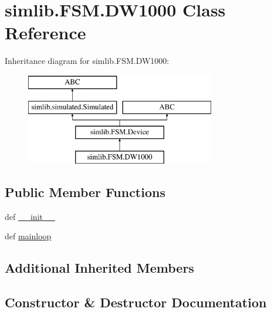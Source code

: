 \hypertarget{classsimlib_1_1_f_s_m_1_1_d_w1000}{}\section{simlib.\+F\+S\+M.\+D\+W1000 Class Reference}
\label{classsimlib_1_1_f_s_m_1_1_d_w1000}
Inheritance diagram for simlib.\+F\+S\+M.\+D\+W1000\+:\begin{figure}[H]
\begin{center}
\leavevmode
\includegraphics[height=4.000000cm]{classsimlib_1_1_f_s_m_1_1_d_w1000}
\end{center}
\end{figure}
\subsection*{Public Member Functions}
\begin{DoxyCompactItemize}
\item 
def \mbox{\hyperlink{classsimlib_1_1_f_s_m_1_1_d_w1000_a0c91896ce1517bade299a3a905b3c26c}{\+\_\+\+\_\+init\+\_\+\+\_\+}}
\item 
def \mbox{\hyperlink{classsimlib_1_1_f_s_m_1_1_d_w1000_aa91a241f59daa1f2479f0d19f60c6124}{mainloop}}
\end{DoxyCompactItemize}
\subsection*{Additional Inherited Members}


\subsection{Constructor \& Destructor Documentation}
\mbox{\label{classsimlib_1_1_f_s_m_1_1_d_w1000_a0c91896ce1517bade299a3a905b3c26c}} 
